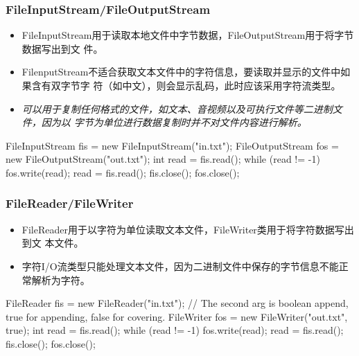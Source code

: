 \begin{frame}[fragile] %
\frametitle{FileInputStream/FileOutputStream}
\begin{itemize}
\item FileInputStream用于读取本地文件中字节数据，FileOutputStream用于将字节数据写出到文
  件。
\item FilenputStream不适合获取文本文件中的字符信息，要读取并显示的文件中如果含有双字节字
  符（如中文），则会显示乱码，此时应该采用字符流类型。
\item {\Red \it 可以用于复制任何格式的文件，如文本、音视频以及可执行文件等二进制文件，因为以
    字节为单位进行数据复制时并不对文件内容进行解析。}
\end{itemize}
\begin{javaCode}
FileInputStream fis = new FileInputStream("in.txt");
FileOutputStream fos = new FileOutputStream("out.txt");
int read = fis.read();
while (read != -1) {
  fos.write(read);
  read = fis.read();
} 
fis.close();
fos.close();
\end{javaCode}
\end{frame}

\begin{frame}[fragile] %
\frametitle{FileReader/FileWriter}
\begin{itemize}
\item FileReader用于以{\hei 字符}为单位读取文本文件，FileWriter类用于将字符数据写出到文
  本文件。
\item 字符I/O流类型只能处理文本文件，因为二进制文件中保存的字节信息不能正常解析为字符。
\end{itemize}
\begin{javaCode}
FileReader fis = new FileReader("in.txt");
// The second arg is boolean append, true for appending, false for covering.
FileWriter fos = new FileWriter("out.txt", true); 
int read = fis.read();
while (read != -1) {
  fos.write(read);
  read = fis.read();
} 
fis.close();
fos.close();
\end{javaCode}
\end{frame}

